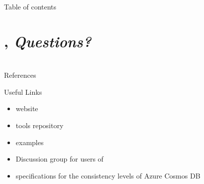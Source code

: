 \documentclass{beamer}
\title{\tlap}
\subtitle{%
    A modeling language for
    \texorpdfstring{\linebreak}{}%
    concurrent and distributed systems
}
\author{M. Donadoni \and A. Fulgini \and E. Morassutto}
\begin{document}
    \begin{frame}
        \maketitle
    \end{frame}

    \begin{frame}{Table of contents}
      \tableofcontents[hideallsubsections]
    \end{frame}

    

    

    

    

    

    \section*{\texorpdfstring{\Circle}{Next}, \emph{Questions?}}
    \begin{frame}
        \sectionpage
    \end{frame}

    \nocite{*}
    \section*{}
    \begin{frame}{References}
        \scriptsize
        
        
    \end{frame}

    \begin{frame}{Useful Links}
        \begin{itemize}
            \item \tlap website\\
            \item \tlap tools repository\\
            \item \tlap examples\\
            \item Discussion group for users of \tlap\\
            \item \tlap specifications for the consistency levels of Azure Cosmos DB\\
        \end{itemize}
    \end{frame}
\end{document}
